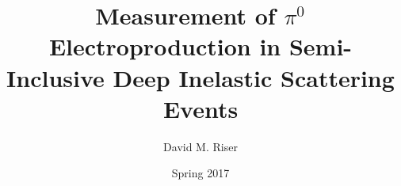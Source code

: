\title{Measurement of $\pi^{0}$ Electroproduction in Semi-Inclusive Deep Inelastic Scattering Events}
\author{David M. Riser}
\date{Spring 2017}

